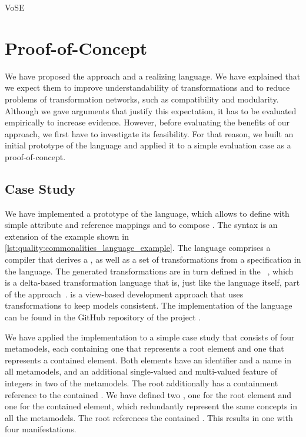 \begin{copiedFrom}{VoSE}

\section{Proof-of-Concept}

We have proposed the \commonalities approach and a realizing language.
We have explained that we expect them to improve understandability of transformations and to reduce problems of transformation networks, such as compatibility and modularity.
Although we gave arguments that justify this expectation, it has to be evaluated empirically to increase evidence.
However, before evaluating the benefits of our approach, we first have to investigate its feasibility.
For that reason, we built an initial prototype of the language and applied it to a simple evaluation case as a proof-of-concept.



\subsection{Case Study}

We have implemented a prototype of the \commonalities language, which allows to define \commonalities with simple attribute and reference mappings and to compose \commonalities.
The syntax is an extension of the example shown in \autoref{lst:quality:commonalities_language_example}.
The language comprises a compiler that derives a \conceptmetamodel, as well as a set of transformations from a specification in the language.
The generated transformations are in turn defined in the \reactionslanguage~\cite{klare2016b}, which is a delta-based transformation language that is, just like the \commonalities language itself, part of the \vitruv approach~\cite{kramer2013b}.
\vitruv is a view-based development approach that uses transformations to keep models consistent.
The implementation of the \commonalities language can be found in the GitHub repository of the \vitruv project \cite{vitruvFrameworkGithub}. %

We have applied the implementation to a simple case study that consists of four metamodels, each containing one \metaclass that represents a root element and one that represents a contained element. 
Both elements have an identifier and a name in all metamodels, and an additional single-valued and multi-valued feature of integers in two of the metamodels.
The root \metaclass additionally has a containment reference to the contained \metaclass.
We have defined two \commonalities, one for the root element and one for the contained element, which redundantly represent the same concepts in all the metamodels.
The root \commonality references the contained \commonality.
This results in one \conceptmetamodel with four manifestations.


\end{copiedFrom}
